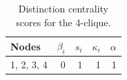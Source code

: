 \begin{table}
\centering
\caption{\label{tab:clique4}Distinction centrality scores for the 4-clique.}
\centering
\begin{tabular}[t]{lrrrr}
\toprule
Nodes & $\beta_i$ & $s_i$ & $\kappa_i$ & $\alpha$\\
\midrule
1, 2, 3, 4 & 0 & 1 & 1 & 1\\
\bottomrule
\end{tabular}
\end{table}
